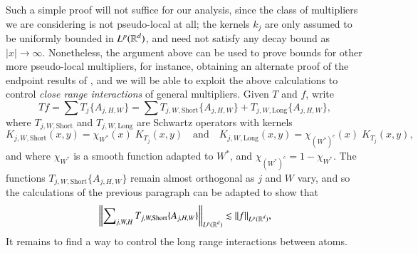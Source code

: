 Such a simple proof will not suffice for our analysis, since the class of multipliers we are considering is not pseudo-local at all; the kernels $k_j$ are only assumed to be uniformly bounded in $L^p(\operatorname{\mathbb{R}}^d)$, and need not satisfy any decay bound as $|x| \to \infty$. Nonetheless, the argument above can be used to prove bounds for other more pseudo-local multipliers, for instance, obtaining an alternate proof of the endpoint results of \cite{SeegerSingular}, and we will be able to exploit the above calculations to control \emph{close range interactions} of general multipliers. Given $T$ and $f$, write
%
\begin{equation}
  Tf = \sum T_j \{ A_{j,H,W} \} = \sum T_{j,W,\text{Short}} \{ A_{j,H,W} \} + T_{j,W,\text{Long}} \{ A_{j,H,W} \},
\end{equation}
%
where $T_{j,W,\text{Short}}$ and $T_{j,W,\text{Long}}$ are Schwartz operators with kernels
%
\begin{equation}
  K_{j,W,\text{Short}}(x,y) = \chi_{W^*}(x)\; K_{T_j}(x,y) \quad\text{and}\quad K_{j,W,\text{Long}}(x,y) = \chi_{(W^*)^c}(x)\; K_{T_j}(x,y),
\end{equation}
%
and where $\chi_{W^*}$ is a smooth function adapted to $W^*$, and $\chi_{(W^*)^c} = 1 - \chi_{W^*}$. The functions $T_{j,W,\text{Short}} \{ A_{j,H,W} \}$ remain almost orthogonal as $j$ and $W$ vary, and so the calculations of the previous paragraph can be adapted to show that
%
\begin{equation}
  \left\| \sum\nolimits_{j,W,H} T_{j,W,\text{Short}} \{ A_{j,H,W} \} \right\|_{L^p(\operatorname{\mathbb{R}}^d)} \lesssim \| f \|_{L^p(\operatorname{\mathbb{R}}^d)},
\end{equation}
%
It remains to find a way to control the long range interactions between atoms.

